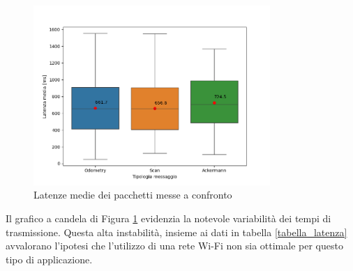 \begin{figure}[H]
\centering
\includegraphics[width=0.8\textwidth]{figures/grafico_latenze.png}
\caption{Latenze medie dei pacchetti messe a confronto}
\label{latency_graph}
\end{figure}

\noindent Il grafico a candela di Figura \ref{latency_graph} evidenzia la notevole variabilità dei tempi di trasmissione. Questa alta instabilità, insieme ai dati in tabella \ref{tabella_latenza} avvalorano l'ipotesi che l'utilizzo di una rete Wi-Fi non sia ottimale per questo tipo di applicazione.